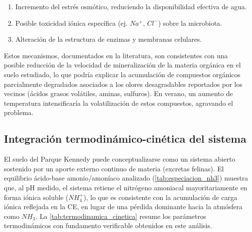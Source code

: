 \documentclass[fleqn]{jaes}
\begin{document}
\begin{enumerate}
  \item Incremento del estrés osmótico, reduciendo la disponibilidad efectiva de agua.
  \item Posible toxicidad iónica específica (ej. $Na^+$, $Cl^-$) sobre la microbiota.
  \item Alteración de la estructura de enzimas y membranas celulares.
\end{enumerate}

Estos mecanismos, documentados en la literatura, son consistentes con una posible reducción de la velocidad de mineralización de la materia orgánica en el suelo estudiado, lo que podría explicar la acumulación de compuestos orgánicos parcialmente degradados asociados a los olores desagradables reportados por los vecinos (ácidos grasos volátiles, aminas, sulfuros). En verano, un aumento de temperatura intensificaría la volatilización de estos compuestos, agravando el problema.

\subsection{Integración termodinámico-cinética del sistema}

El suelo del Parque Kennedy puede conceptualizarse como un sistema abierto sostenido por un aporte externo continuo de materia (excretas felinas). El equilibrio ácido-base amonio/amoníaco analizado (\cref{tab:especiacion_nh3}) muestra que, al pH medido, el sistema retiene el nitrógeno amoniacal mayoritariamente en forma iónica soluble ($NH_4^+$), lo que es consistente con la acumulación de carga iónica reflejada en la CE, en lugar de una pérdida dominante hacia la atmósfera como $NH_3$. La \cref{tab:termodinamica_cinetica} resume los parámetros termodinámicos con fundamento verificable obtenidos en este análisis.
\end{document}
